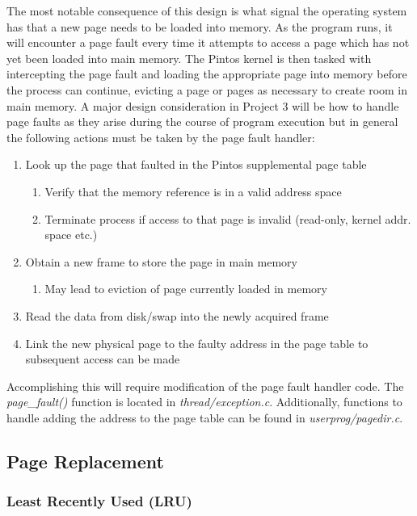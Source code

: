 \documentclass[11pt, letterpaper]{article}
\begin{document}
The most notable consequence of this design is what signal the operating system has that a new page needs to be loaded into memory. As the program runs, it will encounter a page fault every time it attempts to access a page which has not yet been loaded into main memory. The Pintos kernel is then tasked with intercepting the page fault and loading the appropriate page into memory before the process can continue, evicting a page or pages as necessary to create room in main memory. A major design consideration in Project 3 will be how to handle page faults as they arise during the course of program execution but in general the following actions must be taken by the page fault handler:


\begin{enumerate}
\item Look up the page that faulted in the Pintos supplemental page table
\begin{enumerate}
\item Verify that the memory reference is in a valid address space
\item Terminate process if access to that page is invalid (read-only, kernel addr. space etc.)
\end{enumerate}
\item Obtain a new frame to store the page in main memory
\begin{enumerate}
\item May lead to eviction of page currently loaded in memory
\end{enumerate}
\item Read the data from disk/swap into the newly acquired frame
\item Link the new physical page to the faulty address in the page table to subsequent access can be made
\end{enumerate}

Accomplishing this will require modification of the page fault handler code. The\\ \emph{page\_fault()} function is located in \emph{thread/exception.c}. Additionally, functions to handle adding the address to the page table can be found in \emph{userprog/pagedir.c}.


\subsection{Page Replacement}

\subsubsection{Least Recently Used (LRU)}
\end{document}
